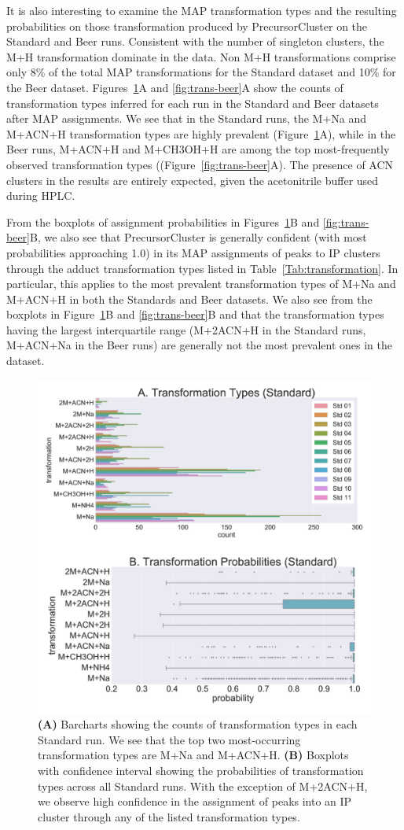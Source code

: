 It is also interesting to examine the MAP transformation types and the resulting probabilities on those transformation produced by PrecursorCluster on the Standard and Beer runs. Consistent with the number of singleton clusters, the M+H transformation dominate in the data. Non M+H transformations comprise only 8\% of the total MAP transformations for the Standard dataset and 10\% for the Beer dataset. Figures~\ref{fig:trans-standards}A and \ref{fig:trans-beer}A show the counts of transformation types inferred for each run in the Standard and Beer datasets after MAP assignments. We see that in the Standard runs, the M+Na and M+ACN+H transformation types are highly prevalent (Figure~\ref{fig:trans-standards}A), while in the Beer runs, M+ACN+H and M+CH3OH+H are among the top most-frequently observed transformation types ((Figure~\ref{fig:trans-beer}A). The presence of ACN clusters in the results are entirely expected, given the acetonitrile buffer used during HPLC.

From the boxplots of assignment probabilities in Figures~\ref{fig:trans-standards}B and \ref{fig:trans-beer}B, we also see that PrecursorCluster is generally confident (with most probabilities approaching 1.0) in its MAP assignments of peaks to IP clusters through the adduct transformation types listed in Table~\ref{Tab:transformation}. In particular, this applies to the most prevalent transformation types of M+Na and M+ACN+H in both the Standards and Beer datasets. We also see from the boxplots in Figure~\ref{fig:trans-standards}B and \ref{fig:trans-beer}B and that the transformation types having the largest interquartile range (M+2ACN+H in the Standard runs, M+ACN+Na in the Beer runs) are generally not the most prevalent ones in the dataset.

\begin{figure}[!htbp]
\centering
\includegraphics[width=0.5\linewidth]{05-precursor-cluster/figures/trans_Standard.pdf}
\caption{\label{fig:trans-standards} \textbf{(A)} Barcharts showing the counts of transformation types in each Standard run. We see that the top two most-occurring transformation types are M+Na and M+ACN+H. \textbf{(B)} Boxplots with confidence interval showing the probabilities of transformation types across all Standard runs. With the exception of M+2ACN+H, we observe high confidence in the assignment of peaks into an IP cluster through any of the listed transformation types.}
\end{figure}

